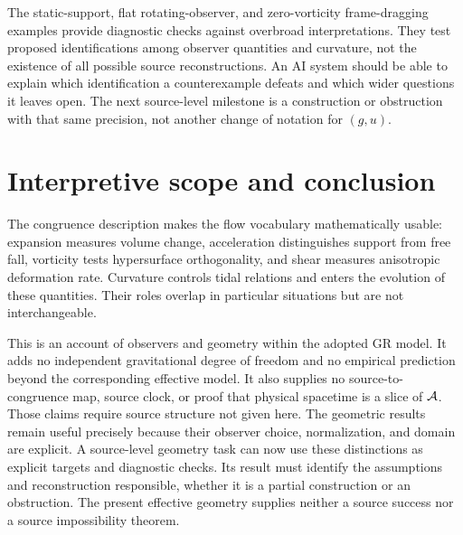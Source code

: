 \documentclass[11pt]{article}
\begin{document}
The static-support, flat rotating-observer, and zero-vorticity frame-dragging examples provide diagnostic checks against overbroad interpretations. They test proposed identifications among observer quantities and curvature, not the existence of all possible source reconstructions. An AI system should be able to explain which identification a counterexample defeats and which wider questions it leaves open. The next source-level milestone is a construction or obstruction with that same precision, not another change of notation for $(g,u)$.

\section{Interpretive scope and conclusion}
The congruence description makes the flow vocabulary mathematically usable: expansion measures volume change, acceleration distinguishes support from free fall, vorticity tests hypersurface orthogonality, and shear measures anisotropic deformation rate. Curvature controls tidal relations and enters the evolution of these quantities. Their roles overlap in particular situations but are not interchangeable.

This is an account of observers and geometry within the adopted GR model. It adds no independent gravitational degree of freedom and no empirical prediction beyond the corresponding effective model. It also supplies no source-to-congruence map, source clock, or proof that physical spacetime is a slice of $\mathcal A$. Those claims require source structure not given here. The geometric results remain useful precisely because their observer choice, normalization, and domain are explicit.
A source-level geometry task can now use these distinctions as explicit targets and diagnostic checks. Its result must identify the assumptions and reconstruction responsible, whether it is a partial construction or an obstruction. The present effective geometry supplies neither a source success nor a source impossibility theorem.

\References
\end{document}
